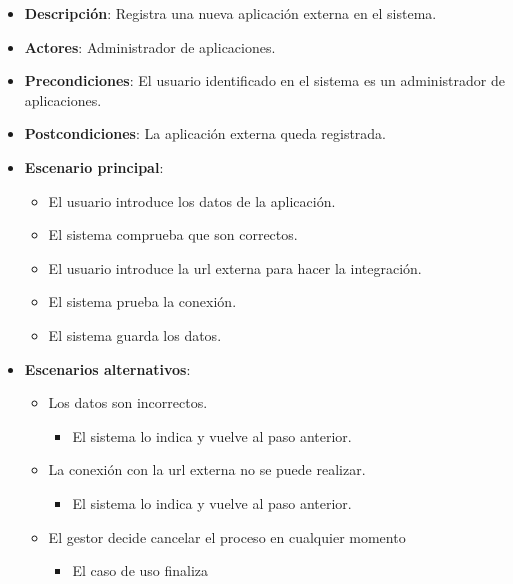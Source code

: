 \documentclass[12pt,a4paperpaper,]{report}
\providecommand{\tightlist}{%
  \setlength{\itemsep}{0pt}\setlength{\parskip}{0pt}}
\begin{document}
\begin{itemize}
\tightlist
\item
  \textbf{Descripción}: Registra una nueva aplicación externa en el
  sistema.
\item
  \textbf{Actores}: Administrador de aplicaciones.
\item
  \textbf{Precondiciones}: El usuario identificado en el sistema es un
  administrador de aplicaciones.
\item
  \textbf{Postcondiciones}: La aplicación externa queda registrada.
\item
  \textbf{Escenario principal}:

  \begin{itemize}
  \tightlist
  \item
    El usuario introduce los datos de la aplicación.
  \item
    El sistema comprueba que son correctos.
  \item
    El usuario introduce la url externa para hacer la integración.
  \item
    El sistema prueba la conexión.
  \item
    El sistema guarda los datos.
  \end{itemize}
\item
  \textbf{Escenarios alternativos}:

  \begin{itemize}
  \tightlist
  \item
    Los datos son incorrectos.

    \begin{itemize}
    \tightlist
    \item
      El sistema lo indica y vuelve al paso anterior.
    \end{itemize}
  \item
    La conexión con la url externa no se puede realizar.

    \begin{itemize}
    \tightlist
    \item
      El sistema lo indica y vuelve al paso anterior.
    \end{itemize}
  \item
    El gestor decide cancelar el proceso en cualquier momento

    \begin{itemize}
    \tightlist
    \item
      El caso de uso finaliza
    \end{itemize}
  \end{itemize}
\end{itemize}
\end{document}
